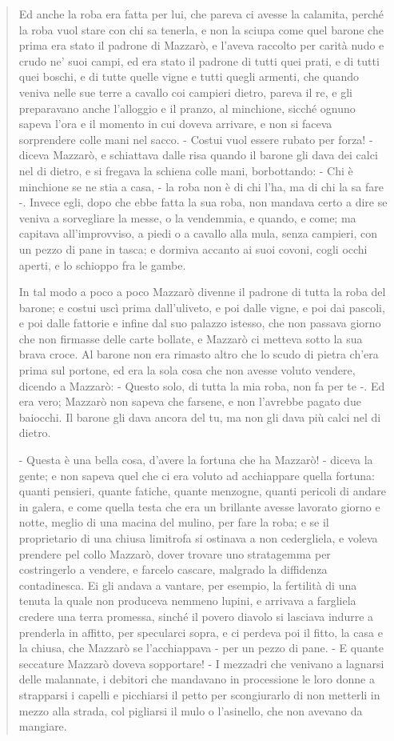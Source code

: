 \documentclass{book}
\begin{document}
\begin{quote}
  Ed anche la roba era fatta per lui, che pareva ci avesse la calamita, perché la roba vuol stare con chi sa tenerla, e non la sciupa come quel barone che prima era stato il padrone di Mazzarò, e l'aveva raccolto per carità nudo e crudo ne' suoi campi, ed era stato il padrone di tutti quei prati, e di tutti quei boschi, e di tutte quelle vigne e tutti quegli armenti, che quando veniva nelle sue terre a cavallo coi campieri dietro, pareva il re, e gli preparavano anche l'alloggio e il pranzo, al minchione, sicché ognuno sapeva l'ora e il momento in cui doveva arrivare, e non si faceva sorprendere colle mani nel sacco. - Costui vuol essere rubato per forza! - diceva Mazzarò, e schiattava dalle risa quando il barone gli dava dei calci nel di dietro, e si fregava la schiena colle mani, borbottando: - Chi è minchione se ne stia a casa, - la roba non è di chi l'ha, ma di chi la sa fare -. Invece egli, dopo che ebbe fatta la sua roba, non mandava certo a dire se veniva a sorvegliare la messe, o la vendemmia, e quando, e come; ma capitava all'improvviso, a piedi o a cavallo alla mula, senza campieri, con un pezzo di pane in tasca; e dormiva accanto ai suoi covoni, cogli occhi aperti, e lo schioppo fra le gambe.
  
  In tal modo a poco a poco Mazzarò divenne il padrone di tutta la roba del barone; e costui uscì prima dall'uliveto, e poi dalle vigne, e poi dai pascoli, e poi dalle fattorie e infine dal suo palazzo istesso, che non passava giorno che non firmasse delle carte bollate, e Mazzarò ci metteva sotto la sua brava croce. Al barone non era rimasto altro che lo scudo di pietra ch'era prima sul portone, ed era la sola cosa che non avesse voluto vendere, dicendo a Mazzarò: - Questo solo, di tutta la mia roba, non fa per te -. Ed era vero; Mazzarò non sapeva che farsene, e non l'avrebbe pagato due baiocchi. Il barone gli dava ancora del tu, ma non gli dava più calci nel di dietro.
  
  - Questa è una bella cosa, d'avere la fortuna che ha Mazzarò! - diceva la gente; e non sapeva quel che ci era voluto ad acchiappare quella fortuna: quanti pensieri, quante fatiche, quante menzogne, quanti pericoli di andare in galera, e come quella testa che era un brillante avesse lavorato giorno e notte, meglio di una macina del mulino, per fare la roba; e se il proprietario di una chiusa limitrofa si ostinava a non cedergliela, e voleva prendere pel collo Mazzarò, dover trovare uno stratagemma per costringerlo a vendere, e farcelo cascare, malgrado la diffidenza contadinesca. Ei gli andava a vantare, per esempio, la fertilità di una tenuta la quale non produceva nemmeno lupini, e arrivava a fargliela credere una terra promessa, sinché il povero diavolo si lasciava indurre a prenderla in affitto, per specularci sopra, e ci perdeva poi il fitto, la casa e la chiusa, che Mazzarò se l'acchiappava - per un pezzo di pane. - E quante seccature Mazzarò doveva sopportare! - I mezzadri che venivano a lagnarsi delle malannate, i debitori che mandavano in processione le loro donne a strapparsi i capelli e picchiarsi il petto per scongiurarlo di non metterli in mezzo alla strada, col pigliarsi il mulo o l'asinello, che non avevano da mangiare.
  

\end{quote}
\end{document}

